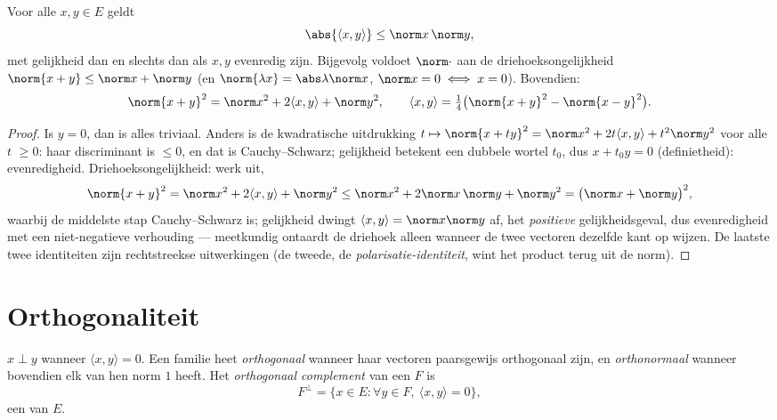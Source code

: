 \begin{theorem}\label{thm:b1:euclid:cs}
Voor alle $x, y \in E$
geldt
\[
\abs{\langle x, y\rangle} \leq \norm x\, \norm y ,
\]
met gelijkheid dan en slechts dan als $x, y$ evenredig zijn.
Bijgevolg voldoet $\norm\cdot$ aan de driehoeksongelijkheid
$\norm{x + y} \leq \norm x + \norm y$ (en $\norm{\lambda x} =
\abs\lambda \norm x$, $\norm x = 0 \iff x = 0$). Bovendien:
\[
\norm{x+y}^2 = \norm x^2 + 2\langle x, y\rangle + \norm y^2,
\qquad
\langle x, y \rangle = \tfrac14\bigl(\norm{x+y}^2 -
\norm{x-y}^2\bigr) .
\]
\end{theorem}

\begin{proof}
Is $y = 0$, dan is alles triviaal. Anders is de kwadratische
uitdrukking $t \mapsto \norm{x + ty}^2 = \norm x^2 + 2t\langle x,
y\rangle + t^2 \norm y^2$ voor alle $t$ $\geq 0$: haar discriminant
is $\leq 0$, en dat is Cauchy--Schwarz; gelijkheid betekent een
dubbele wortel $t_0$, dus $x + t_0 y = 0$ (definietheid):
evenredigheid. Driehoeksongelijkheid: werk uit,
\[
\norm{x + y}^2 = \norm x^2 + 2\langle x, y\rangle + \norm y^2
\leq \norm x^2 + 2\norm x\,\norm y + \norm y^2
= \bigl(\norm x + \norm y\bigr)^2 ,
\]
waarbij de middelste stap Cauchy--Schwarz is; gelijkheid dwingt
$\langle x, y\rangle = \norm x\norm y$ af, het \emph{positieve}
gelijkheidsgeval, dus evenredigheid met een niet-negatieve
verhouding --- meetkundig ontaardt de driehoek alleen wanneer de
twee vectoren dezelfde kant op wijzen. De laatste twee
identiteiten zijn rechtstreekse uitwerkingen (de tweede, de
\emph{polarisatie-identiteit}, wint het product terug uit de
norm).
\end{proof}

\section{Orthogonaliteit}

\begin{definition}\label{def:b1:euclid:orthogonal}
$x \perp y$ wanneer $\langle x, y \rangle = 0$. Een familie heet
\emph{orthogonaal} wanneer haar vectoren paarsgewijs orthogonaal
zijn, en \emph{orthonormaal} wanneer
bovendien elk van hen norm $1$ heeft. Het \emph{orthogonaal
complement} van een  $F$ is
\[
F^{\perp} = \{x \in E : \forall y \in F,\ \langle x, y\rangle =
0\},
\]
een  van $E$.
\end{definition}

